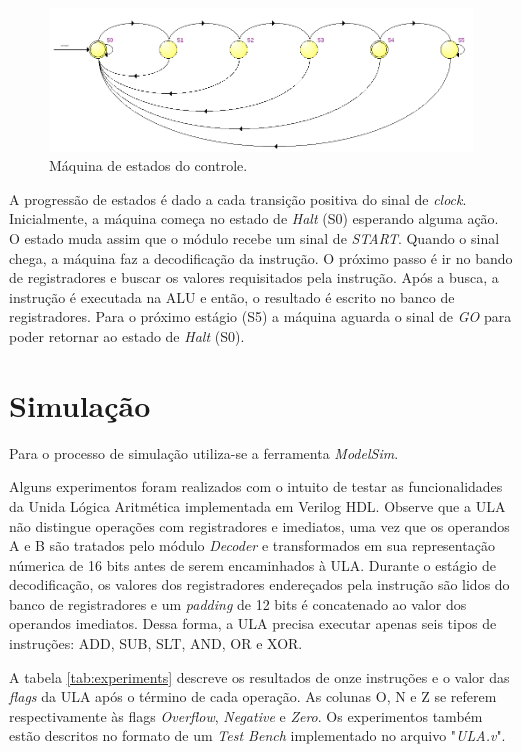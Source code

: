 \documentclass[11pt,a4paper,titlepage]{article}
\begin{document}
\begin{figure}[h]
\centering
\includegraphics[scale=0.4]{images/StateMachine.png}
\caption{Máquina de estados do controle.}
\label{fig:statemachine}
\end{figure}

A progressão de estados é dado a cada transição positiva do sinal de \textit{clock}. Inicialmente, a máquina começa no estado de \textit{Halt} (S0) esperando alguma ação. O estado muda assim que o módulo recebe um sinal de \textit{START}. Quando o sinal chega, a máquina faz a decodificação da instrução. O próximo passo é ir no bando de registradores e buscar os valores requisitados pela instrução. Após a busca, a instrução é executada na ALU e então, o resultado é escrito no banco de registradores. Para o próximo estágio (S5) a máquina aguarda o sinal de \textit{GO} para poder retornar ao estado de \textit{Halt} (S0).

\section{Simulação}

Para o processo de simulação utiliza-se a ferramenta \textit{ModelSim}.

Alguns experimentos foram realizados com o intuito de testar as funcionalidades da Unida Lógica Aritmética implementada em Verilog HDL. Observe que a ULA não distingue operações com registradores e imediatos, uma vez que os operandos A e B são tratados pelo módulo \textit{Decoder} e transformados em sua representação númerica de 16 bits antes de serem encaminhados à ULA. Durante o estágio de decodificação, os valores dos registradores endereçados pela instrução são lidos do banco de registradores e um \textit{padding} de 12 bits é concatenado ao valor dos operandos imediatos. Dessa forma, a ULA precisa executar apenas seis tipos de instruções: ADD, SUB, SLT, AND, OR e XOR.

A tabela \ref{tab:experiments} descreve os resultados de onze  instruções e o valor das \textit{flags} da ULA após o término de cada operação. As colunas O, N e Z se referem respectivamente às flags \textit{Overflow}, \textit{Negative} e \textit{Zero}. Os experimentos também estão descritos no formato de um \textit{Test Bench} implementado no arquivo "\textit{ULA.v}".
\end{document}
